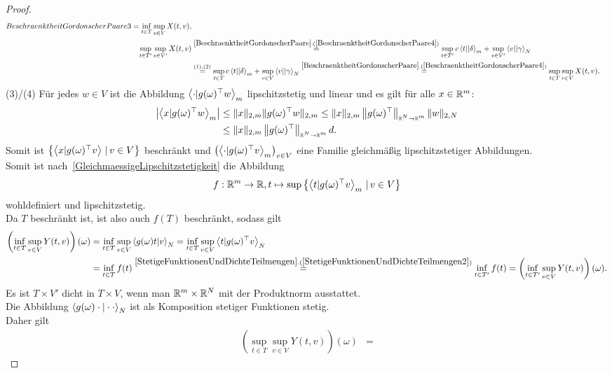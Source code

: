 \begin{proof}
\begin{align*}
{{BeschraenktheitGordonscherPaare3}}=\inf_{t \in T}\sup_{v \in V}X(t, v)\text,\\
\sup_{t \in T'}\sup_{v \in V'}X(t, v) &
\overset{\refclaim{BeschraenktheitGordonscherPaare}
{BeschraenktheitGordonscherPaare4}}=
\sup_{t \in T'}c\bprod t \delta_m + \sup_{v \in V'}\bprod v \gamma_N\\
&\overset{(1),(2)}= 
\sup_{t \in T}c\bprod t \delta_m + \sup_{v \in V}\bprod v \gamma_N
\overset{\refclaim{BeschraenktheitGordonscherPaare}
{BeschraenktheitGordonscherPaare4}}=\sup_{t \in T}\sup_{v \in V}X(t, v)\text.
\end{align*}
(3)/(4) Für jedes $w\in V$ ist die Abbildung $\left\langle \cdot |g(\omega)^\top w\right\rangle_m$
lipschitzstetig und linear und es gilt für alle $x \in \mathbb{R}^m$:
\begin{align}
\left|\left\langle x |g(\omega)^\top w\right\rangle_m\right| &\le
\lVert x\rVert_{2, m}\lVert g(\omega)^\top w\rVert_{2, m} 
\le \lVert x\rVert_{2, m} \left\|g(\omega)^\top\right\|_{\scriptscriptstyle{\ensuremath{\mathbb{R}}^N \rightarrow \ensuremath{\mathbb{R}}^m}} \lVert w\rVert _{2, N}\notag\\
&\le \lVert x\rVert_{2, m} \left\|g(\omega)^\top\right\|_{\scriptscriptstyle{\ensuremath{\mathbb{R}}^N \rightarrow \ensuremath{\mathbb{R}}^m}} d\text.
\label{gpadteq:1}
\end{align}
Somit ist $\left\{\left\langle x |g(\omega)^\top v\right\rangle\,|\,v \in V\right\}$ beschränkt
und $\left(\left\langle \cdot |g(\omega)^\top v\right\rangle_m \right)_{v \in V}$ eine
Familie gleichmäßig lipschitzstetiger Abbildungen.\\
Somit ist nach~\ref{GleichmaessigeLipschitzstetigkeit} die Abbildung
\[f: \mathbb{R}^m \rightarrow \mathbb{R}, t \mapsto 
 \sup\left\{\left\langle t |g(\omega)^\top v\right\rangle_m\,|\,v \in V\right\}\]
wohldefiniert und lipschitzstetig.\\
Da $T$ beschränkt ist, ist also auch $f(T)$ beschränkt, sodass gilt
\begin{align*}
\left(\inf_{t \in T}\sup_{v \in V}Y(t, v) \right)(\omega)&=
\inf_{t \in T} \sup_{v \in V}\sprod {g(\omega)t} v_N =
\inf_{t \in T} \sup_{v \in V}\sprod t {g(\omega)^\top v}_N\\
&= \inf_{t \in T} f(t)
\overset{\refclaim{StetigeFunktionenUndDichteTeilmengen}
{StetigeFunktionenUndDichteTeilmengen2}}=
\inf_{t \in T'} f(t)
 = \left(\inf_{t \in T'}\sup_{v \in V}Y(t, v) \right)(\omega)\text.
\end{align*}
Es ist $T \times V'$ dicht in $T \times V$, wenn man $\mathbb{R}^m \times \mathbb{R}^N$ mit der
Produktnorm ausstattet.\\
Die Abbildung $\left\langle g(\omega)\cdot |\cdot\cdot\right\rangle_N$ ist
als Komposition stetiger Funktionen stetig.\\
Daher gilt
\begin{align*}
\left(\sup_{t \in T}\sup_{v \in V}Y(t, v) \right)(\omega)&= 

\end{align*}
\end{proof}
